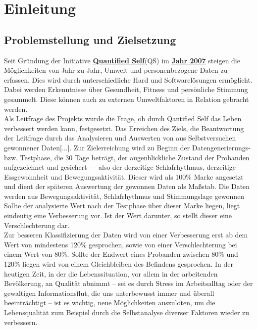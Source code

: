 
\chapter{Einleitung}
\label{ch:Einleitung}

\section{Problemstellung und Zielsetzung}
\label{ch:Einleitung:sec:problemstellung-und-zielsetzung}

Seit Gründung der Initiative \href{http://quantifiedself.com/}{\textbf{Quantified Self}}(QS) im \href{http://quantifiedself.com/2011/03/what-is-the-quantified-self/}{\textbf{Jahr 2007}} steigen die Möglichkeiten von Jahr zu Jahr, Umwelt und personenbezogene Daten zu erfassen. 
Dies wird durch unterschiedliche Hard und Softwarelösungen ermöglicht. \\
Dabei werden Erkenntnisse über Gesundheit, Fitness und persönliche Stimmung gesammelt.
Diese können auch zu externen Umweltfaktoren in Relation gebracht werden. \\
Als Leitfrage des Projekts wurde die Frage, ob durch Qantified Self das Leben verbessert werden kann, festgesetzt. 
Das Erreichen des Ziels, die Beantwortung der Leitfrage durch das Analysieren und Auswerten von aus Selbstversuchen gewonnener Daten[...].
Zur Zielerreichung wird zu Beginn der Datengenerierungs- bzw. Testphase, die 30 Tage beträgt, der augenblickliche Zustand der Probanden aufgezeichnet und gesichert –– also der derzeitige Schlafrhythmus, derzeitige Essgewohnheit und Bewegungsaktivität. %
Dieser wird als 100\% Marke angesetzt und dient der späteren Auswertung der gewonnen Daten als Maßstab. 
Die Daten werden aus Bewegungsaktivität, Schlafrhythmus und Stimmungslage gewonnen 
Sollte der analysierte Wert nach der Testphase über dieser Marke liegen, liegt eindeutig eine Verbesserung vor. 
Ist der Wert darunter, so stellt dieser eine Verschlechterung dar. \\
Zur besseren Klassifizierung der Daten wird von einer Verbesserung erst ab dem Wert von mindestens 120\% gesprochen, sowie von einer Verschlechterung bei einem Wert von 80\%. Sollte der Endwert eines Probanden zwischen 80\% und 120\% liegen wird von einem Gleichbleiben des Befindens gesprochen.
In der heutigen Zeit, in der die Lebenssituation, vor allem in der arbeitenden Bevölkerung, an Qualität abnimmt – sei es durch Stress im Arbeitsalltag oder der gewaltigen Informationsflut, die uns unterbewusst immer und überall beeinträchtigt – ist es wichtig, neue Möglichkeiten auszuloten, um die Lebensqualität zum Beispiel durch die Selbstanalyse diverser Faktoren wieder zu verbessern. \\
